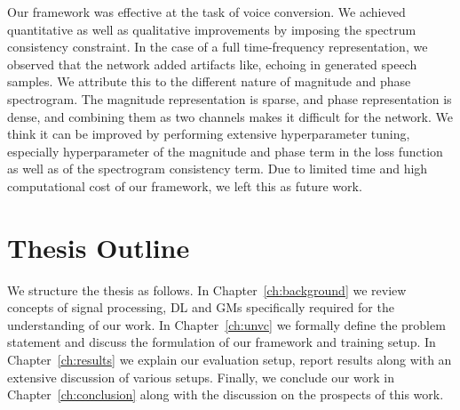 Our framework was effective at the task of voice conversion. We achieved quantitative as well as qualitative improvements by imposing the spectrum consistency constraint. In the case of a full time-frequency representation, we observed that the network added artifacts like, echoing in generated speech samples. We attribute this to the different nature of magnitude and phase spectrogram. The magnitude representation is sparse, and phase representation is dense, and combining them as two channels makes it difficult for the network. We think it can be improved by performing extensive hyperparameter tuning, especially hyperparameter of the magnitude and phase term in the loss function as well as of the spectrogram consistency term. Due to limited time and high computational cost of our framework, we left this as future work.

\section{Thesis Outline}
We structure the thesis as follows. In Chapter~\ref{ch:background} we review concepts of signal processing, DL and GMs specifically required for the understanding of our work. In Chapter~\ref{ch:unvc} we formally define the problem statement and discuss the formulation of our framework and training setup. In Chapter~\ref{ch:results}
we explain our evaluation setup, report results along with an extensive discussion of various setups. Finally, we conclude our work in Chapter~\ref{ch:conclusion} along with the discussion on the prospects of this work.
















%
